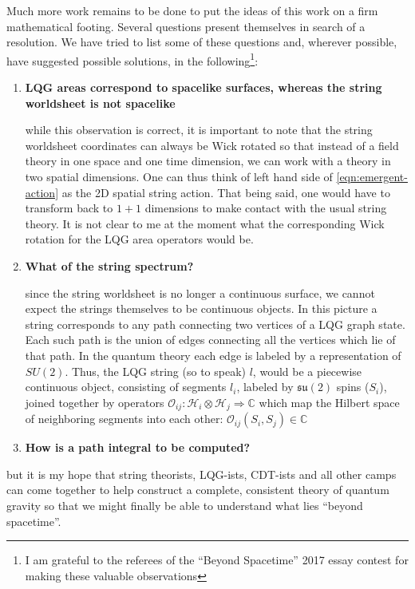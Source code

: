 \documentclass[submission, Phys]{SciPost}
\newcommand{\mc}[1]{\mathcal{#1}}
\newcommand{\mbb}[1]{\mathbb{#1}}
\newcommand{\mf}[1]{\mathfrak{#1}}
\begin{document}
Much more work remains to be done to put the ideas of this work on a firm mathematical footing. Several questions present themselves in search of a resolution. We have tried to list some of these questions and, wherever possible,  have suggested possible solutions, in the following\footnote{I am grateful to the referees of the ``Beyond Spacetime'' 2017 essay contest for making these valuable observations}:
\begin{enumerate}
	\item \textbf{LQG areas correspond to spacelike surfaces, whereas the string worldsheet is not spacelike}
	
	while this observation is correct, it is important to note that the string worldsheet coordinates can always be Wick rotated so that instead of a field theory in one space and one time dimension, we can work with a theory in two spatial dimensions. One can thus think of left hand side of \eqref{eqn:emergent-action} as the 2D spatial string action. That being said, one would have to transform back to $ 1+1 $ dimensions to make contact with the usual string theory. It is not clear to me at the moment what the corresponding Wick rotation for the LQG area operators would be.
	
	\item \textbf{What of the string spectrum?}
	
	since the string worldsheet is no longer a continuous surface, we cannot expect the strings themselves to be continuous objects. In this picture a string corresponds to any path connecting two vertices of a LQG graph state. Each such path is the union of edges connecting all the vertices which lie of that path. In the quantum theory each edge is labeled by a representation of $ SU(2) $. Thus, the LQG string (so to speak) $ l $, would be a piecewise continuous object, consisting of segments $ l_i$, labeled by $ \mf{su}(2) $ spins ($ S_i $), joined together by operators $ \mc{O}_{ij} : \mc{H}_i \otimes \mc{H}_j \Rightarrow \mbb{C} $ which map the Hilbert space of neighboring segments into each other: $ \mc{O}_{ij}(S_i, S_j) \in \mbb{C} $
	
	\item \textbf{How is a path integral to be computed?}
	
	
	
\end{enumerate}

but it is my hope that string theorists, LQG-ists, CDT-ists and all other camps can come together to help construct a complete, consistent theory of quantum gravity so that we might finally be able to understand what lies ``beyond spacetime''.
\end{document}
